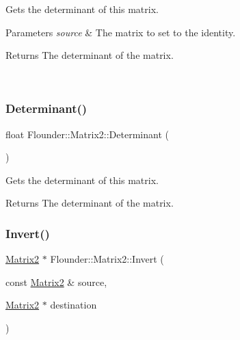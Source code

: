 Gets the determinant of this matrix. 


\begin{DoxyParams}{Parameters}
{\em source} & The matrix to set to the identity. \begin{DoxyReturn}{Returns}
The determinant of the matrix. 
\end{DoxyReturn}
\\
\hline
\end{DoxyParams}
\mbox{\label{class_flounder_1_1_matrix2_a99984cf5d73893ee9e5e5f52b53f7e77}} 
\subsubsection{\texorpdfstring{Determinant()}{Determinant()}\hspace{0.1cm}{\footnotesize\ttfamily [2/2]}}
{\footnotesize\ttfamily float Flounder\+::\+Matrix2\+::\+Determinant (\begin{DoxyParamCaption}{ }\end{DoxyParamCaption})}



Gets the determinant of this matrix. 

\begin{DoxyReturn}{Returns}
The determinant of the matrix. 
\end{DoxyReturn}
\mbox{\label{class_flounder_1_1_matrix2_a23c8ed84d77811f8d1e2875a6aa55175}} 
\subsubsection{\texorpdfstring{Invert()}{Invert()}\hspace{0.1cm}{\footnotesize\ttfamily [1/2]}}
{\footnotesize\ttfamily \hyperlink{class_flounder_1_1_matrix2}{Matrix2} $\ast$ Flounder\+::\+Matrix2\+::\+Invert (\begin{DoxyParamCaption}\item[{const \hyperlink{class_flounder_1_1_matrix2}{Matrix2} \&}]{source,  }\item[{\hyperlink{class_flounder_1_1_matrix2}{Matrix2} $\ast$}]{destination }\end{DoxyParamCaption})\hspace{0.3cm}{\ttfamily [static]}}




